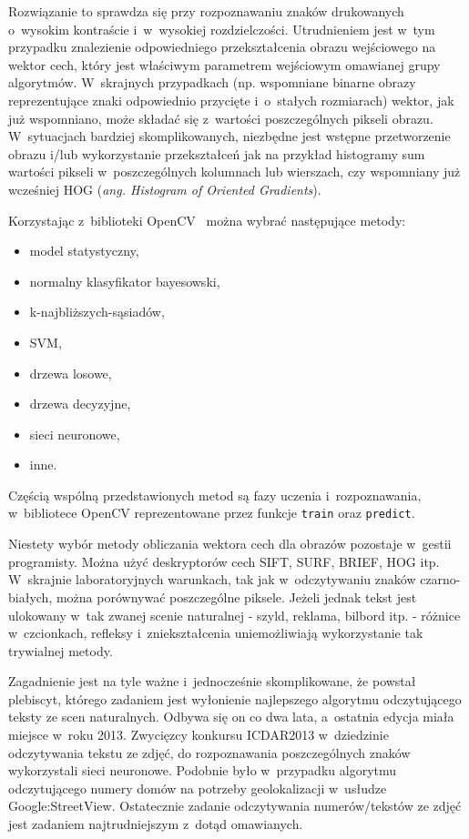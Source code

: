 Rozwiązanie to
sprawdza się przy rozpoznawaniu znaków drukowanych o~wysokim
kontraście i~w~wysokiej rozdzielczości. Utrudnieniem jest w~tym
przypadku znalezienie odpowiedniego przekształcenia obrazu
wejściowego na wektor cech, który jest właściwym 
parametrem wejściowym omawianej grupy algorytmów. W~skrajnych przypadkach
(np. wspomniane binarne obrazy reprezentujące znaki odpowiednio 
przycięte i~o~stałych rozmiarach) wektor, jak już wspomniano, może składać się 
z~wartości poszczególnych pikseli obrazu. W~sytuacjach bardziej 
skomplikowanych, niezbędne jest wstępne przetworzenie obrazu i/lub 
wykorzystanie przekształceń jak na przykład histogramy sum wartości
pikseli w~poszczególnych kolumnach lub wierszach, czy wspomniany
już wcześniej HOG (\textit{ang. Histogram of Oriented Gradients}).

Korzystając z~biblioteki
OpenCV \ można wybrać następujące metody:

\begin{itemize}
    \item model statystyczny,
    \item normalny klasyfikator bayesowski,
    \item k-najbliższych-sąsiadów,
    \item SVM,
    \item drzewa losowe,
    \item drzewa decyzyjne,
    \item sieci neuronowe,
    \item inne.
\end{itemize}

Częścią wspólną przedstawionych metod są
fazy uczenia i~rozpoznawania, w~bibliotece
OpenCV reprezentowane przez funkcje \verb|train| oraz \verb|predict|.

Niestety wybór metody obliczania wektora cech dla obrazów
pozostaje w~gestii programisty.
Można użyć deskryptorów cech
SIFT, SURF, BRIEF, HOG itp. W~skrajnie laboratoryjnych warunkach, tak
jak w~odczytywaniu znaków czarno-białych, można porównywać poszczególne
piksele. Jeżeli jednak tekst
jest ulokowany w~tak zwanej scenie naturalnej -
szyld, reklama, bilbord itp. - różnice w~czcionkach, refleksy
i~zniekształcenia uniemożliwiają wykorzystanie tak trywialnej metody.

Zagadnienie jest na tyle ważne i~jednocześnie skomplikowane, że
powstał plebiscyt, którego zadaniem jest wyłonienie najlepszego
algorytmu odczytującego teksty ze scen naturalnych. Odbywa się
on co dwa lata, a~ostatnia edycja miała miejsce w~roku 2013.
Zwycięzcy konkursu ICDAR2013 w~dziedzinie odczytywania tekstu ze
zdjęć, do rozpoznawania poszczególnych znaków wykorzystali sieci neuronowe.
Podobnie było w~przypadku algorytmu odczytującego numery domów na potrzeby
geolokalizacji w~usłudze Google:StreetView. Ostatecznie zadanie
odczytywania numerów/tekstów ze zdjęć jest zadaniem najtrudniejszym
z~dotąd omawianych.

